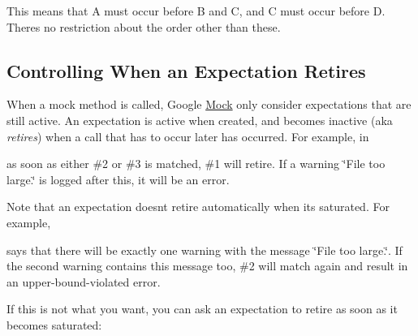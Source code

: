 This means that A must occur before B and C, and C must occur before D. There\textquotesingle{}s no restriction about the order other than these.

\subsection*{Controlling When an Expectation Retires}

When a mock method is called, Google \hyperlink{class_mock}{Mock} only consider expectations that are still active. An expectation is active when created, and becomes inactive (aka {\itshape retires}) when a call that has to occur later has occurred. For example, in




as soon as either \#2 or \#3 is matched, \#1 will retire. If a warning {\ttfamily \char`\"{}\+File too large.\char`\"{}} is logged after this, it will be an error.

Note that an expectation doesn\textquotesingle{}t retire automatically when it\textquotesingle{}s saturated. For example,




says that there will be exactly one warning with the message {\ttfamily \char`\"{}\+File
too large.\char`\"{}}. If the second warning contains this message too, \#2 will match again and result in an upper-\/bound-\/violated error.

If this is not what you want, you can ask an expectation to retire as soon as it becomes saturated\+:




